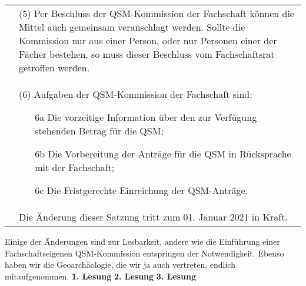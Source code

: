 {\begin{longtable}{|p{7.5cm}|p{7.5cm}|}
        &(5) Per Beschluss der QSM-Kommission der Fachschaft können die Mittel auch gemeinsam
        veranschlagt werden. Sollte die Kommission nur aus einer Person, oder nur Personen
        einer der Fächer bestehen, so muss dieser Beschluss vom Fachschaftsrat getroffen
        werden. \\
        &(6) Aufgaben der QSM-Kommission der Fachschaft sind: 
        \begin{itemize}
        \item[6a] Die vorzeitige Information über den zur Verfügung stehenden Betrag für die QSM;
        \item[6b]Die Vorbereitung der Anträge für die QSM in Rücksprache mit der Fachschaft;
        \item[6c]   Die Fristgerechte Einreichung der QSM-Anträge.
        \end{itemize}\\
        & Die Änderung dieser Satzung tritt zum 01. Januar 2021 in Kraft.\\
    \end{longtable}
}{
    Einige der Änderungen sind zur Lesbarkeit, andere wie die Einführung einer Fachschaftseigenen QSM-Kommission entspringen der Notwendigkeit. Ebenso haben wir die Geoarchäologie, die wir ja auch vertreten, endlich mitaufgenommen.
}{
    \textbf{1. Lesung}
    \ul{
    }
    \textbf{2. Lesung}
    \ul{
    }
    \textbf{3. Lesung}
    \ul{
    }
}{

}

